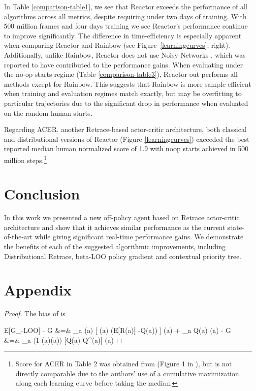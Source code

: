 \documentclass{article}
\newcommand{\beqan}{}
\newcommand{\E}{{\mathbb E}}
\begin{document}
In Table \ref{comparison-table1}, we see that Reactor exceeds the performance of all algorithms across all metrics, 
despite requiring under two days of training. With 500 million frames and four days training we see Reactor's performance 
continue to improve significantly. The difference in time-efficiency is especially apparent when 
comparing Reactor and Rainbow (see Figure~\ref{learningcurves}, right).
Additionally, unlike Rainbow, Reactor does not use Noisy Networks 
\citep{fortunato2017noisy}, which was reported to have contributed 
to the performance gains. When evaluating under the no-op starts regime (Table \ref{comparison-table3}), 
Reactor out performs all methods except for Rainbow. This suggests that Rainbow is more sample-efficient
when training and evaluation regimes match exactly, but may be overfitting to particular trajectories due to 
the significant drop in performance when evaluated on the random human starts.

Regarding ACER, another Retrace-based actor-critic 
architecture, both classical and distributional versions of Reactor (Figure 
\ref{learningcurves}) exceeded the best 
reported median human normalized score of 1.9 with noop starts achieved in 500 
million steps.\footnote{
  \label{acerfootnote}
  Score for ACER in Table 2 was obtained from (Figure 1 in 
  \cite{wang2017sample}), but is not directly comparable due to the authors' 
  use of a cumulative maximization along each learning curve before taking the median.
}
\section{Conclusion}
In this work we presented a new off-policy agent based on Retrace actor-critic 
architecture and show that it achieves similar performance as the 
current state-of-the-art while giving significant real-time performance gains. 
We demonstrate the benefits of each of the suggested algorithmic improvements, 
including Distributional Retrace, beta-LOO policy gradient and contextual 
priority tree.



\normalsize

\onecolumn

\section{Appendix}

\propbias*
\begin{proof}
The bias of \beta is
\beqan
\E[\hat G_{\mbox{\tiny -LOO}}] - G &=& \sum_a \mu(a) [ \beta(a) (\E[R(a)] -Q(a)) ] \nabla\pi(a) + \sum_{a} Q(a) \nabla\pi(a) - G\\
&=& \sum_a (1-\mu(a)\beta(a)) [Q(a)-Q^{\pi}(a)] \nabla\pi(a)
\eeqan
\end{proof}
\end{document}
